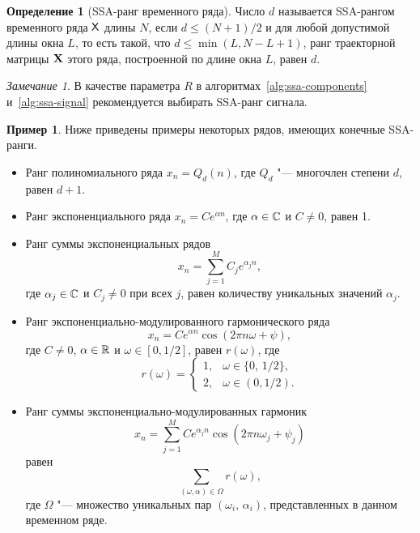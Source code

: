 \documentclass[specialist,
  substylefile=spbu_report.rtx,
subf,href,colorlinks=true, 12pt]{disser}
\theoremstyle{plain}
\theoremstyle{definition}
\newtheorem{definition}{Определение}[section]
\newtheorem{example}{Пример}[section]
\theoremstyle{remark}
\newtheorem{remark}{Замечание}[section]
\begin{document}
\begin{definition}[SSA-ранг временного ряда]
  \label{def:ssa-rank}
  Число $d$ называется SSA-рангом временного ряда $\mathsf{X}$ длины $N$,
  если $d \leqslant (N+1) / 2$ и для любой допустимой
  длины окна $L$,
  то есть такой, что $d \leqslant \min(L, N- L + 1)$, ранг
  траекторной матрицы $\mathbf{X}$ этого ряда, построенной по
  длине окна $L$, равен $d$.
\end{definition}
\begin{remark}
  В качестве параметра $R$ в алгоритмах~\ref{alg:ssa-components}
  и~\ref{alg:ssa-signal} рекомендуется выбирать
  SSA-ранг сигнала.
\end{remark}

\begin{example}
  \label{ex:ssa-ranks}
  Ниже приведены примеры некоторых рядов, имеющих конечные SSA-ранги.
  \begin{itemize}
    \item Ранг полиномиального ряда $x_n = Q_d(n)$, где $Q_d$ "---
      многочлен степени $d$, равен $d + 1$.
    \item Ранг экспоненциального ряда $x_n = C e^{\alpha n}$, где
      $\alpha \in \mathbb{C}$ и $C \ne 0$, равен 1.
    \item Ранг суммы экспоненциальных рядов
      \[
        x_n = \sum_{j=1}^{M} C_j e^{\alpha_j n},
      \]
      где $\alpha_j \in \mathbb{C}$ и $C_j \ne 0$ при всех $j$, равен
      количеству уникальных
      значений $\alpha_j$.
    \item Ранг экспоненциально-модулированного гармонического ряда
      \[
        x_n = C e^{\alpha n}\cos(2 \pi n \omega + \psi),
      \]
      где $C \ne 0$, $\alpha \in \mathbb{R}$ и $\omega \in [0,1/2]$,
      равен $r(\omega)$, где
      \begin{equation}
        \label{eq:cos-rank}
        r(\omega) =
        \begin{cases}
          1, & \omega \in \{0,\, 1/2\},\\
          2, & \omega \in (0, 1/2).
        \end{cases}
      \end{equation}
    \item Ранг суммы экспоненциально-модулированных гармоник
      \[
        x_n = \sum_{j=1}^{M} C e^{\alpha_j n}\cos(2 \pi n \omega_j + \psi_j)
      \]
      равен
      \begin{equation*}
        \label{eq:cos-sum-rank}
        \sum_{(\omega, \alpha)\in \Omega} r(\omega),
      \end{equation*}
      где $\Omega$ "--- множество уникальных пар $(\omega_i,\,
      \alpha_i)$, представленных в данном временном ряде.
  \end{itemize}
\end{example}
\end{document}
